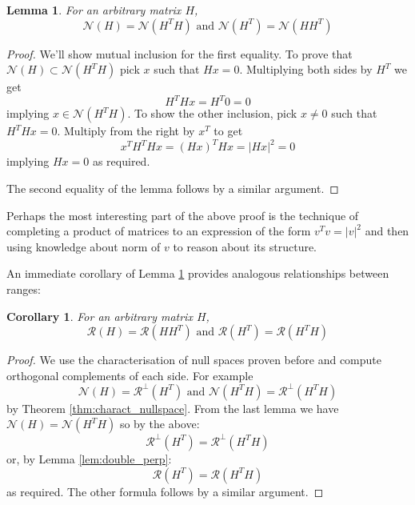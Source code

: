 \documentclass[a4paper]{article}
\theoremstyle{break}
\newtheorem{corollary}{Corollary}[theorem]
\newtheorem{lemma}[theorem]{Lemma}
\newcommand{\Nu}{\mathcal{N}}
\newcommand{\Ra}{\mathcal{R}}
\begin{document}
\begin{lemma}
    \label{lem:nullspaces_hht}
    For an arbitrary matrix $H$,
    $$\Nu(H) = \Nu(H^T H) \text{ and } \Nu(H^T) = \Nu(H H^T)$$
\end{lemma}

\begin{proof}
    We'll show mutual inclusion for the first equality. To prove that $\Nu(H) \subset \Nu(H^T H)$ pick $x$ such that $H x = 0$. Multiplying both sides by $H^T$ we get
    $$ H^T H x = H^T 0 = 0 $$
    implying $x \in \Nu(H^T H) $.
    To show the other inclusion, pick $x \neq 0$ such that $H^T H x = 0$. Multiply from the right by $x^T$ to get
    $$ x^T H^T H x = (H x)^T H x = | H x |^2 = 0 $$
    implying $ H x =0 $ as required.
    
    The second equality of the lemma follows by a similar argument.
\end{proof}

Perhaps the most interesting part of the above proof is the technique of completing a product of matrices to an expression of the form $v^T v = | v |^2 $ and then using knowledge about norm of $v$ to reason about its structure.

An immediate corollary of Lemma \ref{lem:nullspaces_hht} provides analogous relationships between ranges:

\begin{corollary}\label{cor:equal_ranges}
    For an arbitrary matrix $H$,
    $$\Ra(H) = \Ra(H H^T) \text{ and } \Ra(H^T) = \Ra(H^T H)$$
\end{corollary}

\begin{proof}
    We use the characterisation of null spaces proven before and compute orthogonal complements of each side. For example
    $$ \Nu(H) = \Ra^\perp (H^T) \text{ and } \Nu(H^T H) = \Ra^\perp ( H^T H )$$
    by Theorem \ref{thm:charact_nullspace}. From the last lemma we have
    $ \Nu(H) = \Nu(H^T H) $ so by the above:
    $$ \Ra^\perp (H^T) = \Ra^\perp ( H^T H ) $$
    or, by Lemma \ref{lem:double_perp}:
    $$ \Ra (H^T) = \Ra( H^T H ) $$
    as required. The other formula follows by a similar argument.
\end{proof}
\end{document}
